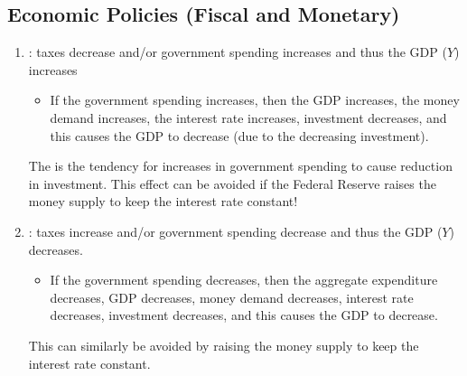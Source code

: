 \documentclass{article}
\begin{document}
\subsection{Economic Policies (Fiscal and Monetary)}

\begin{enumerate}
  \item {}: taxes decrease and/or government spending increases and thus the GDP ($Y$) increases 
    \begin{itemize}
      \item If the government spending increases, then the GDP increases, the money demand increases, the interest rate increases, investment decreases, and this causes the GDP to decrease (due to the decreasing investment). 
    \end{itemize}
    The  is the tendency for increases in government spending to cause reduction in investment. This effect can be avoided if the Federal Reserve raises the money supply to keep the interest rate constant!
  \item {}: taxes increase and/or government spending decrease and thus the GDP ($Y$) decreases. 
    \begin{itemize}
      \item If the government spending decreases, then the aggregate expenditure decreases, GDP decreases, money demand decreases, interest rate decreases, investment decreases, and this causes the GDP to decrease. 
    \end{itemize}
    This can similarly be avoided by raising the money supply to keep the interest rate constant. 
\end{enumerate}
\end{document}
